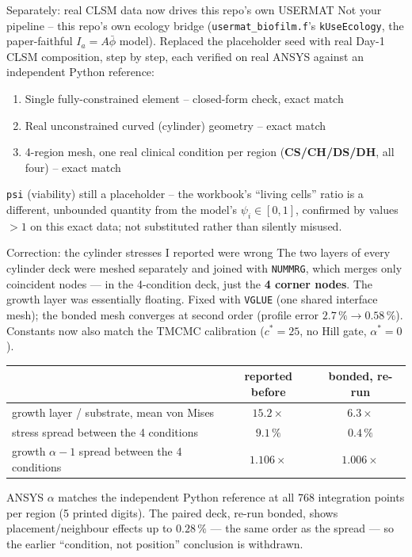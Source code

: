\documentclass[aspectratio=169,11pt]{beamer}
\begin{document}
\begin{frame}{Separately: real CLSM data now drives this repo's own USERMAT}
\small Not your pipeline -- this repo's own ecology bridge
(\texttt{usermat\_biofilm.f}'s \texttt{kUseEcology}, the paper-faithful
$I_a=A\bar\phi$ model). Replaced the placeholder seed with real Day-1
CLSM composition, step by step, each verified on real ANSYS against an
independent Python reference:
\vspace{4pt}
\begin{enumerate}
  \item Single fully-constrained element -- closed-form check, exact match
  \item Real unconstrained curved (cylinder) geometry -- exact match
  \item 4-region mesh, one real clinical condition per region
        (\textbf{CS/CH/DS/DH}, all four) -- exact match
\end{enumerate}
\vspace{4pt}
\texttt{psi} (viability) still a placeholder -- the workbook's ``living
cells'' ratio is a different, unbounded quantity from the model's
$\psi_i\in[0,1]$, confirmed by values $>1$ on this exact data; not
substituted rather than silently misused.
\end{frame}

\begin{frame}{Correction: the cylinder stresses I reported were wrong}
\small The two layers of every cylinder deck were meshed separately and
joined with \texttt{NUMMRG}, which merges only coincident nodes --- in the
4-condition deck, just the \textbf{4 corner nodes}. The growth layer was
essentially floating. Fixed with \texttt{VGLUE} (one shared interface mesh);
the bonded mesh converges at second order (profile error
$2.7\,\% \to 0.58\,\%$). Constants now also match the TMCMC calibration
($c^*=25$, no Hill gate, $\alpha^*=0$).
\vspace{6pt}
\begin{center}
\begin{tabular}{@{}lcc@{}}
\toprule
 & \textbf{reported before} & \textbf{bonded, re-run}\\
\midrule
growth layer / substrate, mean von Mises & $15.2\times$ & $\mathbf{6.3\times}$\\
stress spread between the 4 conditions & $9.1\,\%$ & $\mathbf{0.4\,\%}$\\
growth $\alpha-1$ spread between the 4 conditions & $1.106\times$ & $1.006\times$\\
\bottomrule
\end{tabular}
\end{center}
\vspace{6pt}
{\footnotesize ANSYS $\alpha$ matches the independent Python reference at all
768 integration points per region (5 printed digits). The paired deck,
re-run bonded, shows placement/neighbour effects up to $0.28\,\%$ --- the same
order as the spread --- so the earlier ``condition, not position''
conclusion is withdrawn.}
\end{frame}
\end{document}
